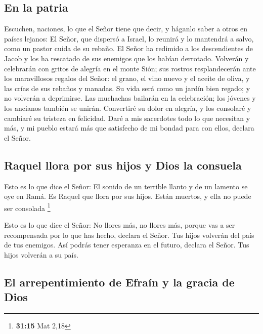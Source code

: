 \hypertarget{en-la-patria}{%
\subsection{En la patria}\label{en-la-patria}}

 Escuchen, naciones, lo que el Señor tiene que decir, y
háganlo saber a otros en países lejanos: El Señor, que dispersó a
Israel, lo reunirá y lo mantendrá a salvo, como un pastor cuida de su
rebaño.  El Señor ha redimido a los descendientes de
Jacob y los ha rescatado de sus enemigos que los habían derrotado.
 Volverán y celebrarán con gritos de alegría en el monte
Sión; sus rostros resplandecerán ante los maravillosos regalos del
Señor: el grano, el vino nuevo y el aceite de oliva, y las crías de sus
rebaños y manadas. Su vida será como un jardín bien regado; y no
volverán a deprimirse.  Las muchachas bailarán en la
celebración; los jóvenes y los ancianos también se unirán. Convertiré su
dolor en alegría, y los consolaré y cambiaré su tristeza en felicidad.
 Daré a mis sacerdotes todo lo que necesitan y más, y mi
pueblo estará más que satisfecho de mi bondad para con ellos, declara el
Señor.

\hypertarget{raquel-llora-por-sus-hijos-y-dios-la-consuela}{%
\subsection{Raquel llora por sus hijos y Dios la
consuela}\label{raquel-llora-por-sus-hijos-y-dios-la-consuela}}

 Esto es lo que dice el Señor: El sonido de un terrible
llanto y de un lamento se oye en Ramá. Es Raquel que llora por sus
hijos. Están muertos, y ella no puede ser consolada \footnote{\textbf{31:15}
  Mat 2,18}

 Esto es lo que dice el Señor: No llores más, no llores
más, porque vas a ser recompensada por lo que has hecho, declara el
Señor. Tus hijos volverán del país de tus enemigos.  Así
podrás tener esperanza en el futuro, declara el Señor. Tus hijos
volverán a su país.

\hypertarget{el-arrepentimiento-de-efrauxedn-y-la-gracia-de-dios}{%
\subsection{El arrepentimiento de Efraín y la gracia de
Dios}\label{el-arrepentimiento-de-efrauxedn-y-la-gracia-de-dios}}

